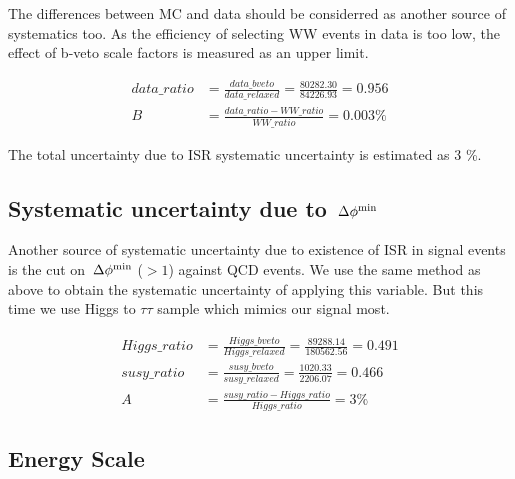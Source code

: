 
The differences between MC and data should be considerred as another source of systematics too. As the efficiency of selecting WW events in data is too low, the effect of b-veto scale factors is measured as an upper limit.

\begin{align}
data\_ratio &= \frac{data\_bveto}{data\_relaxed} = \frac{80282.30}{84226.93} = 0.956 \\ \nonumber
B &= \frac{data\_ratio - WW\_ratio}{WW\_ratio} = 0.003 \% \nonumber
\end{align}

The total uncertainty due to ISR systematic uncertainty is estimated as 3 \%.

\subsection{\texorpdfstring{Systematic uncertainty due to $\,{\Delta\phi^{\rm min}}$}{Systematic uncertainty due to minDeltaPhi40}}
Another source of systematic uncertainty due to existence of ISR in signal events is the cut on $\,{\Delta\phi^{\rm min}}$ ($ > 1$) against QCD events. We use the same method as above to obtain the systematic uncertainty of applying this variable. But this time we use Higgs to $\tau \tau$ sample which mimics our signal most.

\begin{align}
Higgs\_ratio &= \frac{Higgs\_bveto}{Higgs\_relaxed} = \frac{89288.14}{180562.56} = 0.491 \\ \nonumber
susy\_ratio &= \frac{susy\_bveto}{susy\_relaxed} = \frac{1020.33}{2206.07} = 0.466 \\ \nonumber
A &= \frac{susy\_ratio - Higgs\_ratio}{Higgs\_ratio} = 3 \% 
\end{align}

\subsection{\texorpdfstring{\hadtau Energy Scale}{Tau Energy Scale}}

